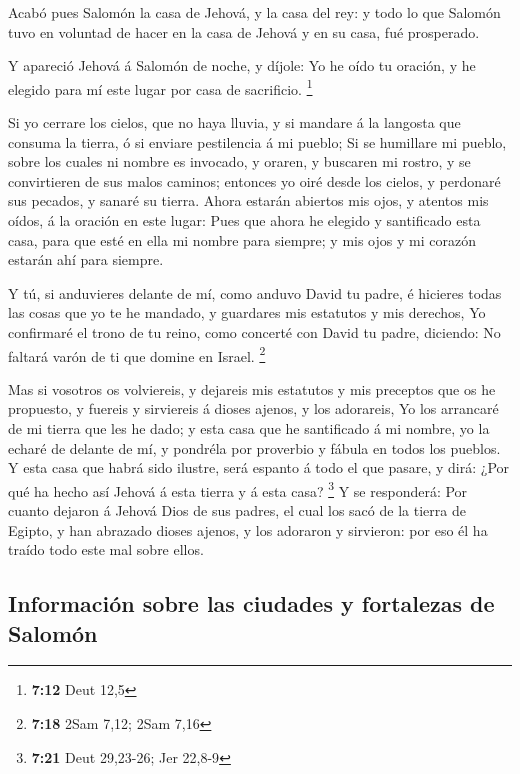  Acabó pues Salomón la casa de Jehová, y la casa del rey: y
todo lo que Salomón tuvo en voluntad de hacer en la casa de Jehová y en
su casa, fué prosperado.

 Y apareció Jehová á Salomón de noche, y díjole: Yo he oído
tu oración, y he elegido para mí este lugar por casa de sacrificio.
\footnote{\textbf{7:12} Deut 12,5}

 Si yo cerrare los cielos, que no haya lluvia, y si mandare
á la langosta que consuma la tierra, ó si enviare pestilencia á mi
pueblo;  Si se humillare mi pueblo, sobre los cuales ni
nombre es invocado, y oraren, y buscaren mi rostro, y se convirtieren de
sus malos caminos; entonces yo oiré desde los cielos, y perdonaré sus
pecados, y sanaré su tierra.  Ahora estarán abiertos mis
ojos, y atentos mis oídos, á la oración en este lugar: 
Pues que ahora he elegido y santificado esta casa, para que esté en ella
mi nombre para siempre; y mis ojos y mi corazón estarán ahí para
siempre.

 Y tú, si anduvieres delante de mí, como anduvo David tu
padre, é hicieres todas las cosas que yo te he mandado, y guardares mis
estatutos y mis derechos,  Yo confirmaré el trono de tu
reino, como concerté con David tu padre, diciendo: No faltará varón de
ti que domine en Israel. \footnote{\textbf{7:18} 2Sam 7,12; 2Sam 7,16}

 Mas si vosotros os volviereis, y dejareis mis estatutos y
mis preceptos que os he propuesto, y fuereis y sirviereis á dioses
ajenos, y los adorareis,  Yo los arrancaré de mi tierra que
les he dado; y esta casa que he santificado á mi nombre, yo la echaré de
delante de mí, y pondréla por proverbio y fábula en todos los pueblos.
 Y esta casa que habrá sido ilustre, será espanto á todo el
que pasare, y dirá: ¿Por qué ha hecho así Jehová á esta tierra y á esta
casa? \footnote{\textbf{7:21} Deut 29,23-26; Jer 22,8-9}  Y
se responderá: Por cuanto dejaron á Jehová Dios de sus padres, el cual
los sacó de la tierra de Egipto, y han abrazado dioses ajenos, y los
adoraron y sirvieron: por eso él ha traído todo este mal sobre ellos.

\hypertarget{informaciuxf3n-sobre-las-ciudades-y-fortalezas-de-salomuxf3n}{%
\subsection{Información sobre las ciudades y fortalezas de
Salomón}\label{informaciuxf3n-sobre-las-ciudades-y-fortalezas-de-salomuxf3n}}

